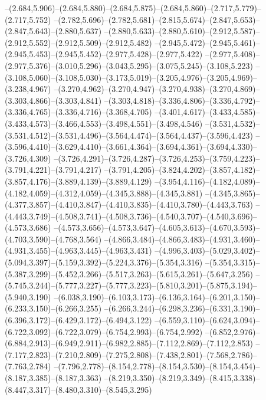   --(2.684,5.906)--(2.684,5.880)--(2.684,5.875)--(2.684,5.860)--(2.717,5.779)--(2.717,5.752)%
  --(2.782,5.696)--(2.782,5.681)--(2.815,5.674)--(2.847,5.653)--(2.847,5.643)--(2.880,5.637)%
  --(2.880,5.633)--(2.880,5.610)--(2.912,5.587)--(2.912,5.552)--(2.912,5.509)--(2.912,5.482)%
  --(2.945,5.472)--(2.945,5.461)--(2.945,5.453)--(2.945,5.452)--(2.977,5.428)--(2.977,5.422)%
  --(2.977,5.408)--(2.977,5.376)--(3.010,5.296)--(3.043,5.295)--(3.075,5.245)--(3.108,5.223)%
  --(3.108,5.060)--(3.108,5.030)--(3.173,5.019)--(3.205,4.976)--(3.205,4.969)--(3.238,4.967)%
  --(3.270,4.962)--(3.270,4.947)--(3.270,4.938)--(3.270,4.869)--(3.303,4.866)--(3.303,4.841)%
  --(3.303,4.818)--(3.336,4.806)--(3.336,4.792)--(3.336,4.765)--(3.336,4.716)--(3.368,4.705)%
  --(3.401,4.617)--(3.433,4.585)--(3.433,4.573)--(3.466,4.553)--(3.498,4.551)--(3.498,4.546)%
  --(3.531,4.532)--(3.531,4.512)--(3.531,4.496)--(3.564,4.474)--(3.564,4.437)--(3.596,4.423)%
  --(3.596,4.410)--(3.629,4.410)--(3.661,4.364)--(3.694,4.361)--(3.694,4.330)--(3.726,4.309)%
  --(3.726,4.291)--(3.726,4.287)--(3.726,4.253)--(3.759,4.223)--(3.791,4.221)--(3.791,4.217)%
  --(3.791,4.205)--(3.824,4.202)--(3.857,4.182)--(3.857,4.176)--(3.889,4.139)--(3.889,4.129)%
  --(3.954,4.116)--(4.182,4.089)--(4.182,4.059)--(4.312,4.059)--(4.345,3.888)--(4.345,3.881)%
  --(4.345,3.865)--(4.377,3.857)--(4.410,3.847)--(4.410,3.835)--(4.410,3.780)--(4.443,3.763)%
  --(4.443,3.749)--(4.508,3.741)--(4.508,3.736)--(4.540,3.707)--(4.540,3.696)--(4.573,3.686)%
  --(4.573,3.656)--(4.573,3.647)--(4.605,3.613)--(4.670,3.593)--(4.703,3.590)--(4.768,3.564)%
  --(4.866,3.484)--(4.866,3.483)--(4.931,3.460)--(4.931,3.455)--(4.963,3.445)--(4.963,3.431)%
  --(4.996,3.403)--(5.029,3.402)--(5.094,3.397)--(5.159,3.392)--(5.224,3.376)--(5.354,3.316)%
  --(5.354,3.315)--(5.387,3.299)--(5.452,3.266)--(5.517,3.263)--(5.615,3.261)--(5.647,3.256)%
  --(5.745,3.244)--(5.777,3.227)--(5.777,3.223)--(5.810,3.201)--(5.875,3.194)--(5.940,3.190)%
  --(6.038,3.190)--(6.103,3.173)--(6.136,3.164)--(6.201,3.150)--(6.233,3.150)--(6.266,3.255)%
  --(6.266,3.244)--(6.298,3.236)--(6.331,3.190)--(6.396,3.172)--(6.429,3.172)--(6.494,3.122)%
  --(6.559,3.110)--(6.624,3.094)--(6.722,3.092)--(6.722,3.079)--(6.754,2.993)--(6.754,2.992)%
  --(6.852,2.976)--(6.884,2.913)--(6.949,2.911)--(6.982,2.885)--(7.112,2.869)--(7.112,2.853)%
  --(7.177,2.823)--(7.210,2.809)--(7.275,2.808)--(7.438,2.801)--(7.568,2.786)--(7.763,2.784)%
  --(7.796,2.778)--(8.154,2.778)--(8.154,3.530)--(8.154,3.454)--(8.187,3.385)--(8.187,3.363)%
  --(8.219,3.350)--(8.219,3.349)--(8.415,3.338)--(8.447,3.317)--(8.480,3.310)--(8.545,3.295)%
